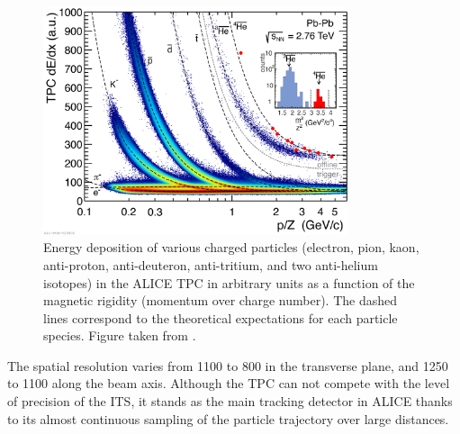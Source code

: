 \begin{figure}[t]
	\centering
	\includegraphics[width=0.8\textwidth]{Figs/Chapter3/dEdx_PbPb_2011_withAlphaInlet_NoLogo.eps}
	\caption{Energy deposition of various charged particles (electron, pion, kaon, anti-proton, anti-deuteron, anti-tritium, and two anti-helium isotopes) in the ALICE TPC in arbitrary units as a function of the magnetic rigidity (momentum over charge number). The dashed lines correspond to the theoretical expectations for each particle species. Figure taken from \cite{alicecollaborationALICEExperimentJourney2022}.}
	\label{fig:TPCdEdx}
\end{figure}

The spatial resolution varies from 1100 to 800 \mum in the transverse plane, and 1250 to 1100 \mum along the beam axis. Although the TPC can not compete with the level of precision of the ITS, it stands as the main tracking detector in ALICE thanks to its almost continuous sampling of the particle trajectory over large distances.

